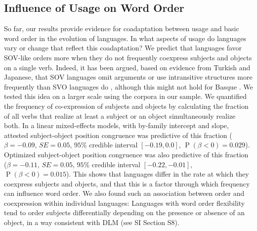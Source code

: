 \documentclass[9pt,twocolumn,twoside,lineno]{pnas-new}
\begin{document}
\subsection*{Influence of Usage on Word Order}
So far, our results provide evidence for coadaptation between usage and basic word order in the evolution of languages.
In what aspects of usage do languages vary or change that reflect this coadaptation?
We predict that languages favor SOV-like orders more when they do not frequently coexpress subjects and objects on a single verb.
Indeed, it has been argued, based on evidence from Turkish and Japanese, that SOV languages omit arguments or use intransitive structures more frequently than SVO languages do \citep{hiranuma1999syntactic,ueno2009does,luk2014investigating}, although this might not hold for Basque \citep{pastor2013processing}.
We tested this idea on a larger scale using the corpora in our sample.
We quantified the frequency of co-expression of subjects and objects by calculating the fraction of all verbs that realize at least a subject or an object simultaneously realize both.
In a linear mixed-effects models, with by-family intercept and slope, attested subject-object position congruence was predictive of this fraction ($\beta=-0.09$, $SE=0.05$, $95\%$ credible interval $[-0.19, 0.0]$, $\operatorname{P}(\beta<0) = 0.029$). %
Optimized subject-object position congruence was also predictive of this fraction ($\beta=-0.11$, $SE=0.05$, $95\%$ credible interval $[-0.22,  -0.01]$, $\operatorname{P}(\beta<0) = 0.015$). %
This shows that languages differ in the rate at which they coexpress subjects and objects, and that this is a factor through which frequency can influence word order.
We also found such an association between order and coexpression within individual languages: Languages with word order flexibility tend to order subjects differentially depending on the presence or absence of an object, in a way consistent with DLM (see SI Section S8).




\end{document}

